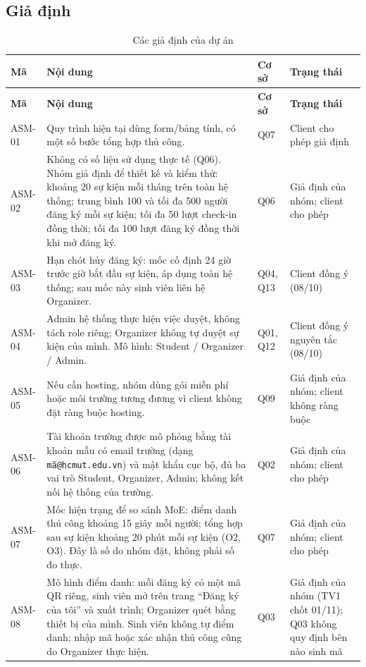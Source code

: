 \subsection*{Giả định}
\begingroup\tblsetup\tblzebra
\begin{longtable}{L{1.5cm}L{6.5cm}L{1.5cm}L{3.5cm}}
\caption{Các giả định của dự án}\label{tab:assumptions}\\
\toprule
{}\textbf{Mã} & \textbf{Nội dung} & \textbf{Cơ sở} & \textbf{Trạng thái} \\
\midrule
\endfirsthead
\toprule
{}\textbf{Mã} & \textbf{Nội dung} & \textbf{Cơ sở} & \textbf{Trạng thái} \\
\midrule
\endhead
\bottomrule
\endlastfoot
ASM-01 & Quy trình hiện tại dùng form/bảng tính, có một số bước tổng hợp thủ công. & Q07 & Client cho phép giả định \\
ASM-02 & Không có số liệu sử dụng thực tế (Q06). Nhóm giả định để thiết kế và kiểm thử: khoảng 20 sự kiện mỗi tháng trên toàn hệ thống; trung bình 100 và tối đa 500 người đăng ký mỗi sự kiện; tối đa 50 lượt check-in đồng thời; tối đa 100 lượt đăng ký đồng thời khi mở đăng ký. & Q06 & Giả định của nhóm; client cho phép \\
ASM-03 & Hạn chót hủy đăng ký: mốc cố định 24 giờ trước giờ bắt đầu sự kiện, áp dụng toàn hệ thống; sau mốc này sinh viên liên hệ Organizer. & Q04, Q13 & Client đồng ý (08/10) \\
ASM-04 & Admin hệ thống thực hiện việc duyệt, không tách role riêng; Organizer không tự duyệt sự kiện của mình. Mô hình: Student / Organizer / Admin. & Q01, Q12 & Client đồng ý nguyên tắc (08/10) \\
ASM-05 & Nếu cần hosting, nhóm dùng gói miễn phí hoặc môi trường tương đương vì client không đặt ràng buộc hosting. & Q09 & Giả định của nhóm; client không ràng buộc \\
ASM-06 & Tài khoản trường được mô phỏng bằng tài khoản mẫu có email trường (dạng \texttt{mã@hcmut.edu.vn}) và mật khẩu cục bộ, đủ ba vai trò Student, Organizer, Admin; không kết nối hệ thống của trường. & Q02 & Giả định của nhóm; client cho phép \\
ASM-07 & Mốc hiện trạng để so sánh MoE: điểm danh thủ công khoảng 15 giây mỗi người; tổng hợp sau sự kiện khoảng 20 phút mỗi sự kiện (O2, O3). Đây là số do nhóm đặt, không phải số đo thực. & Q07 & Giả định của nhóm; client cho phép \\
ASM-08 & Mô hình điểm danh: mỗi đăng ký có một mã QR riêng, sinh viên mở trên trang \enquote{Đăng ký của tôi} và xuất trình; Organizer quét bằng thiết bị của mình. Sinh viên không tự điểm danh; nhập mã hoặc xác nhận thủ công cũng do Organizer thực hiện. & Q03 & Giả định của nhóm (TV1 chốt 01/11); Q03 không quy định bên nào sinh mã \\
\end{longtable}
\endgroup

